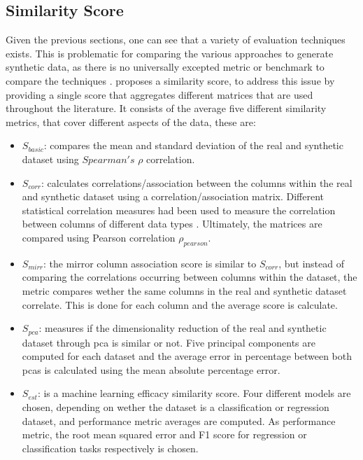 \subsection{Similarity Score}
\label{ch:preliminaries-similarityScore}
Given the previous sections, one can see that a variety of evaluation techniques exists.
This is problematic for comparing the various approaches to generate synthetic data, as there is no universally excepted metric or benchmark to compare the techniques \cite{hernandez2022SyntheticDataGeneration}.
\cite{brenninkmeijer2019GenerationEvaluationTabular} proposes a similarity score, to address this issue by providing a single score that aggregates different matrices that are used throughout the literature. 
It consists of the average five different similarity metrics, that cover different aspects of the data, these are:
\begin{itemize}
  \item $S_{basic}$: compares the mean and standard deviation of the real and synthetic dataset using $Spearman's$ $\rho$ \cite{lane2003IntroductionStatistics} correlation.
  \item $S_{corr}$: calculates correlations/association between the columns within the real and synthetic dataset using a correlation/association matrix. 
  Different statistical correlation measures had been used to measure the correlation between columns of different data types \cite[p. 37]{brenninkmeijer2019GenerationEvaluationTabular}.
  Ultimately, the matrices are compared using Pearson correlation $\rho_{pearson}$.
  \item $S_{mirr}$: the mirror column association score is similar to $S_{corr}$, but instead of comparing the correlations occurring between columns within the dataset,
  the metric compares wether the same columns in the real and synthetic dataset correlate.
  This is done for each column and the average score is calculate.
  \item $S_{pca}$: measures if the dimensionality reduction of the real and synthetic dataset through \gls{pca} is similar or not.
  Five principal components are computed for each dataset and the average error in percentage between both \glspl{pca} is calculated using the mean absolute percentage error.
  \item $S_{est}$: is a machine learning efficacy similarity score. Four different models are chosen, depending on wether the dataset is a classification or regression dataset, and performance metric averages are computed.
  As performance metric, the root mean squared error and F1 score for regression or classification tasks respectively is chosen.
\end{itemize}






